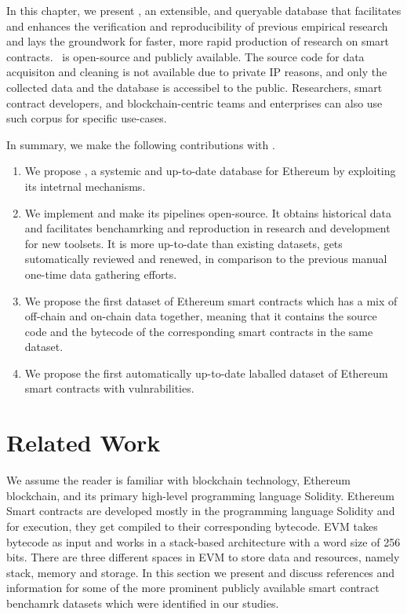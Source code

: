 	In this chapter, we present \etherbase, an extensible, and queryable database that facilitates and enhances the verification and reproducibility of previous empirical
	research and lays the groundwork for faster, more rapid production of research on smart contracts.
	\etherbase~is open-source and publicly available.
	The source code for data acquisiton and cleaning is not available due to private IP reasons, and only the collected data and the database is accessibel to the public.
	Researchers, smart contract developers, and blockchain-centric teams and enterprises can also use such corpus for specific use-cases.

	In summary, we make the following contributions with \etherbase.
	\begin{enumerate}
		\item We propose \etherbase, a systemic and up-to-date database for Ethereum by exploiting its intetrnal mechanisms.
		\item We implement \etherbase and make its pipelines open-source. It obtains historical data and facilitates benchamrking and reproduction in research and development for new toolsets. It is more up-to-date than existing datasets, gets sutomatically reviewed and renewed, in comparison to the previous manual one-time data gathering efforts.
		\item We propose the first dataset of Ethereum smart contracts which has a mix of off-chain and on-chain data together, meaning that it contains the source code and the bytecode of
		the corresponding smart contracts in the same dataset.
		\item We propose the first automatically up-to-date laballed dataset of Ethereum smart contracts with vulnrabilities.
	\end{enumerate}

\section{Related Work}
	\label{sec:relwork}
	We assume the reader is familiar with blockchain technology, Ethereum blockchain, and its primary high-level programming language Solidity.
	Ethereum Smart contracts are developed mostly in the programming language Solidity and for execution, they get compiled to their corresponding bytecode.
	EVM takes bytecode as input and works in a stack-based architecture with a word size of 256 bits.
	There are three different spaces in EVM to store data and resources, namely stack, memory and storage.
	In this section we present and discuss references and information for some of the more prominent publicly available smart contract benchamrk datasets which were identified in our studies.

